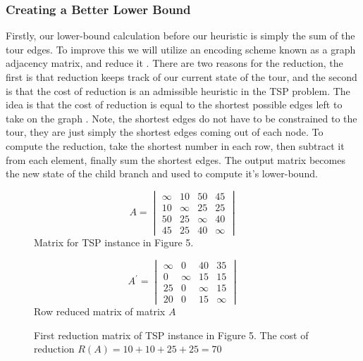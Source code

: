     \subsubsection{Creating a Better Lower Bound}
    Firstly, our lower-bound calculation before our heuristic is simply the sum 
    of the tour edges. To improve this we will utilize an encoding scheme known as 
    a graph adjacency matrix, and reduce it \cite{rastogi2013proposed}. There are two reasons for the reduction, 
    the first is that reduction keeps track of our current state of the tour, and the second
    is that the cost of reduction is an admissible heuristic in the TSP problem.
    The idea is that the cost of reduction is equal to the shortest possible edges left to
    take on the graph \cite{rastogi2013proposed}. Note, the shortest edges do not have to be constrained to the tour, they
    are just simply the shortest edges coming out of each node. To compute the reduction, take the
    shortest number in each row, then subtract it from each element, finally sum the shortest edges.
    The output matrix becomes the new state of the child branch and used to compute it's lower-bound.\\
    \begin{figure}[H]
        \begin{minipage}{.5\linewidth}
          \centering
          \begin{equation*}
            A = 
            \begin{vmatrix}
                \infty & 10 & 50 & 45\\
                10 & \infty & 25 & 25 \\
                50 & 25 & \infty & 40 \\
                45 & 25 & 40 & \infty
	        \end{vmatrix}
          \end{equation*}
          Matrix for TSP instance in Figure 5.
        \end{minipage}%
        \begin{minipage}{.5\linewidth}
          \centering
          \begin{equation*}
            A^{'} = 
                \begin{vmatrix}
                    \infty & 0 & 40 & 35\\
                    0 & \infty & 15 & 15 \\
                    25 & 0 & \infty & 15 \\
                    20 & 0 & 15 & \infty
                \end{vmatrix}
            \end{equation*}
          Row reduced matrix of matrix $A$\\
        \end{minipage}
        \caption{First reduction matrix of TSP instance in Figure 5.
                The cost of reduction $ R(A) = 10 + 10 + 25 + 25 = 70$}
      \end{figure}

